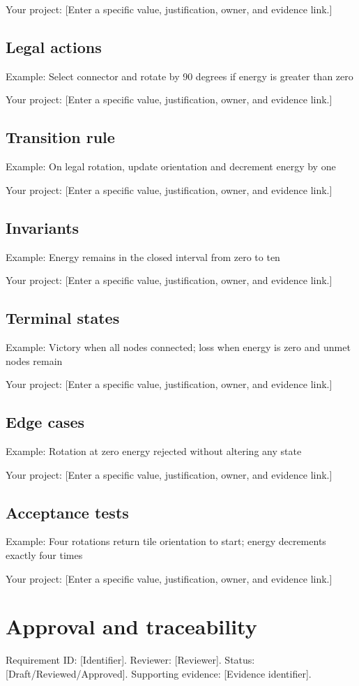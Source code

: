 \documentclass[11pt]{article}
\begin{document}
Your project: [Enter a specific value, justification, owner, and evidence link.]


\subsection{Legal actions}
Example: Select connector and rotate by 90 degrees if energy is greater than zero

Your project: [Enter a specific value, justification, owner, and evidence link.]


\subsection{Transition rule}
Example: On legal rotation, update orientation and decrement energy by one

Your project: [Enter a specific value, justification, owner, and evidence link.]


\subsection{Invariants}
Example: Energy remains in the closed interval from zero to ten

Your project: [Enter a specific value, justification, owner, and evidence link.]


\subsection{Terminal states}
Example: Victory when all nodes connected; loss when energy is zero and unmet nodes remain

Your project: [Enter a specific value, justification, owner, and evidence link.]


\subsection{Edge cases}
Example: Rotation at zero energy rejected without altering any state

Your project: [Enter a specific value, justification, owner, and evidence link.]


\subsection{Acceptance tests}
Example: Four rotations return tile orientation to start; energy decrements exactly four times

Your project: [Enter a specific value, justification, owner, and evidence link.]


\section{Approval and traceability}
Requirement ID: [Identifier]. Reviewer: [Reviewer]. Status: [Draft/Reviewed/Approved]. Supporting evidence: [Evidence identifier].
\end{document}
